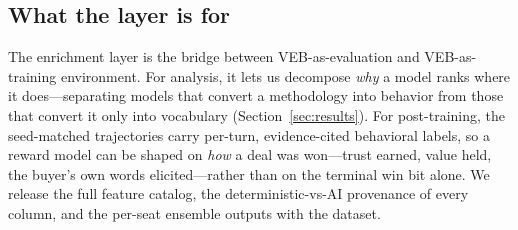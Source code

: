 \subsection{What the layer is for}
The enrichment layer is the bridge between VEB-as-evaluation and VEB-as-training
environment. For analysis, it lets us decompose \emph{why} a model ranks where it
does---separating models that convert a methodology into behavior from those that
convert it only into vocabulary (Section~\ref{sec:results}). For post-training, the
seed-matched trajectories carry per-turn, evidence-cited behavioral labels, so a
reward model can be shaped on \emph{how} a deal was won---trust earned, value held,
the buyer's own words elicited---rather than on the terminal win bit alone. We
release the full feature catalog, the deterministic-vs-AI provenance of every
column, and the per-seat ensemble outputs with the dataset.
